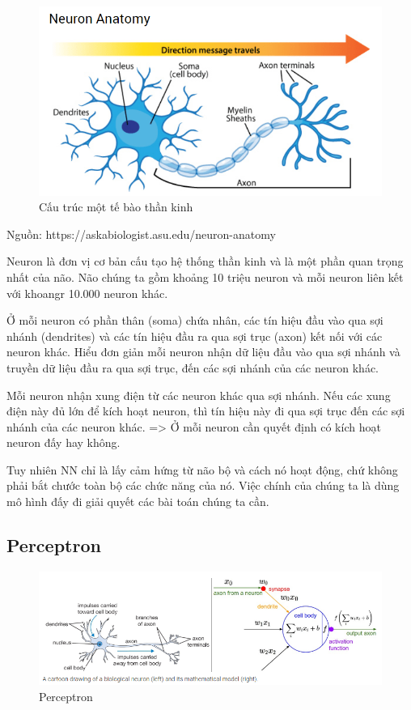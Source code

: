 \FloatBarrier
\begin{figure}[htp]
\begin{center}
\includegraphics[scale=0.8]{chap2/c2_figs/neuron.png}
\end{center}
\caption{Cấu trúc một tế bào thần kinh}
\label{fig:neuronsinhhoc}
\end{figure}
\FloatBarrier
\centerline{Nguồn: https://askabiologist.asu.edu/neuron-anatomy}

Neuron là đơn vị cơ bản cấu tạo hệ thống thần kinh và là một phần quan trọng nhất của não. Não chúng ta gồm khoảng 10 triệu neuron và mỗi neuron liên kết với khoangr 10.000 neuron khác.

Ở mỗi neuron có phần thân (soma) chứa nhân, các tín hiệu đầu vào qua sợi nhánh (dendrites) và các tín hiệu đầu ra qua sợi trục (axon) kết nối với các neuron khác. Hiểu đơn giản mỗi neuron nhận dữ liệu đầu vào qua sợi nhánh và truyền dữ liệu đầu ra qua sợi trục, đến các sợi nhánh của các neuron khác.

Mỗi neuron nhận xung điện từ các neuron khác qua sợi nhánh. Nếu các xung điện này đủ lớn để kích hoạt neuron, thì tín hiệu này đi qua sợi trục đến các sợi nhánh của các neuron khác. => Ở mỗi neuron cần quyết định có kích hoạt neuron đấy hay không.

Tuy nhiên NN chỉ là lấy cảm hứng từ não bộ và cách nó hoạt động, chứ không phải bắt chước toàn bộ các chức năng của nó. Việc chính của chúng ta là dùng mô hình đấy đi giải quyết các bài toán chúng ta cần.

\subsection{Perceptron}
\label{s:perceptron}
\FloatBarrier
\begin{figure}[htp]
\begin{center}
\includegraphics[scale=0.6]{chap2/c2_figs/perceptron.PNG}
\end{center}
\caption{Perceptron}
\label{fig:perceptron}
\end{figure}
\FloatBarrier


